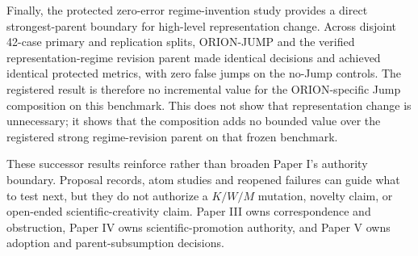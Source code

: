 Finally, the protected zero-error regime-invention study provides a direct strongest-parent boundary for high-level representation change. Across disjoint 42-case primary and replication splits, ORION-JUMP and the verified representation-regime revision parent made identical decisions and achieved identical protected metrics, with zero false jumps on the no-Jump controls. The registered result is therefore no incremental value for the ORION-specific Jump composition on this benchmark. This does not show that representation change is unnecessary; it shows that the composition adds no bounded value over the registered strong regime-revision parent on that frozen benchmark.

These successor results reinforce rather than broaden Paper I's authority boundary. Proposal records, atom studies and reopened failures can guide what to test next, but they do not authorize a $K/W/M$ mutation, novelty claim, or open-ended scientific-creativity claim. Paper III owns correspondence and obstruction, Paper IV owns scientific-promotion authority, and Paper V owns adoption and parent-subsumption decisions.

